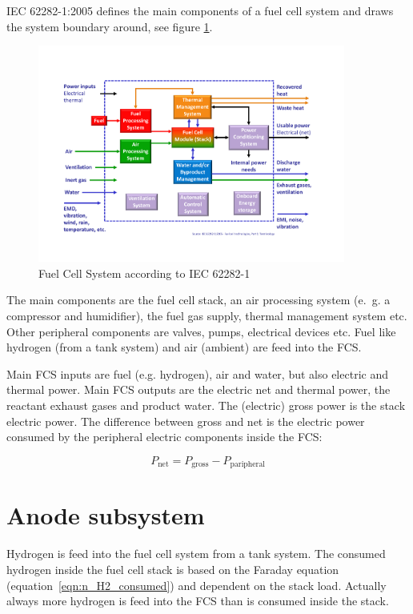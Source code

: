 \documentclass[11pt,a4paper,english,twoside]{scrreprt}
\begin{document}
IEC 62282-1:2005 \cite{IEC62282-1} defines the main components of a fuel cell system and draws the system boundary around, see figure \ref{fig:FCSbound}. 

\begin{figure}
  \centering
  \includegraphics*[width=0.9\textwidth,angle=0]{FCF_Figure_FCS_boundaries.pdf}
  \caption[Fuel Cell System according to IEC 62282-1]{Fuel Cell System according to IEC 62282-1}
  \label{fig:FCSbound}
\end{figure}

The main components are the fuel cell stack, an air processing system (e.~g. a compressor and humidifier), the fuel gas supply, thermal management system etc. Other peripheral components are valves, pumps, electrical devices etc. Fuel like hydrogen (from a tank system) and air (ambient) are feed into the FCS.

Main FCS inputs are fuel (e.g. hydrogen), air and water, but also electric and thermal power. Main FCS outputs are the electric net and thermal power, the reactant exhaust gases and product water. The (electric) gross power is the stack electric power. The difference between gross and net is the electric power consumed by the peripheral electric components inside the FCS:

\[P_\text{net} =P_\text{gross} -P_\text{paripheral}\]


\section{Anode subsystem}

Hydrogen is feed into the fuel cell system from a tank system. The consumed hydrogen inside the fuel cell stack is based on the Faraday equation (equation~\ref{eqn:n_H2_consumed}) and dependent on the stack load. Actually always more hydrogen is feed into the FCS than is consumed inside the stack. 
\end{document}
